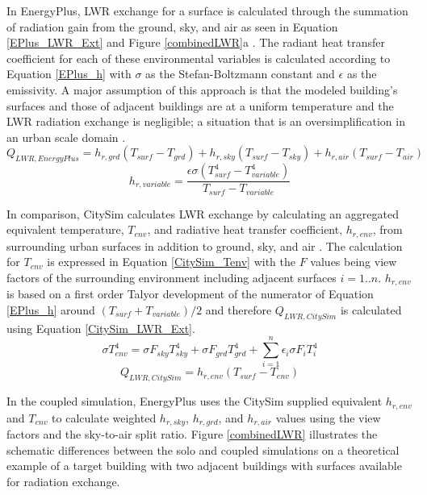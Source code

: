 \documentclass{tBPS2e}
\theoremstyle{plain}
\theoremstyle{definition}
\theoremstyle{remark}
\begin{document}
In EnergyPlus, LWR exchange for a surface is calculated through the summation of radiation gain from the ground, sky, and air as seen in Equation \ref{EPlus_LWR_Ext} and Figure \ref{combinedLWR}a \citep{doe2010energyplus}. The radiant heat transfer coefficient for each of these environmental variables is calculated according to Equation \ref{EPlus_h} with $\sigma$ as the Stefan-Boltzmann constant and $\epsilon$ as the emissivity. A major assumption of this approach is that the modeled building's surfaces and those of adjacent buildings are at a uniform temperature and the LWR radiation exchange is negligible; a situation that is an oversimplification in an urban
scale domain \citep{Evins:2014cf}.
\begin{equation} \label{EPlus_LWR_Ext} 
Q_{LWR,EnergyPlus} = h_{r,grd}(T_{surf}-T_{grd}) + h_{r,sky}(T_{surf}-T_{sky}) + h_{r,air}(T_{surf}-T_{air})
\end{equation}
\begin{equation} \label{EPlus_h} 
h_{r,variable} = \frac{\epsilon\sigma(T^{4}_{surf}-T^{4}_{variable})}{T_{surf}-T_{variable}}
\end{equation}

In comparison, CitySim calculates LWR exchange by calculating an aggregated equivalent temperature, $T_{env}$, and radiative heat transfer coefficient, $h_{r,env}$, from surrounding urban surfaces in addition to ground, sky, and air \citep{Robinson:2009tm}. The calculation for $T_{env}$ is expressed in Equation \ref{CitySim_Tenv} with the $F$ values being view factors of the surrounding environment including adjacent surfaces $i=1..n$. $h_{r,env}$ is based on a first order Talyor development of the numerator of Equation \ref{EPlus_h} around $(T_{surf}+T_{variable})/2$ and therefore $Q_{LWR,CitySim}$ is calculated using Equation \ref{CitySim_LWR_Ext}.
\begin{equation} \label{CitySim_Tenv} 
\sigma T_{env}^4 = \sigma F_{sky}T_{sky}^4 +\sigma F_{grd}T_{grd}^4 + \sum_{i=1}^{n} \epsilon_i \sigma F_{i}T_{i}^4
\end{equation}
\begin{equation} \label{CitySim_LWR_Ext} 
Q_{LWR,CitySim} = h_{r,env}(T_{surf}-T_{env})
\end{equation}

In the coupled simulation, EnergyPlus uses the CitySim supplied equivalent $h_{r,env}$ and $T_{env}$ to calculate weighted $h_{r,sky}$, $h_{r,grd}$, and $h_{r,air}$ values using the view factors and the sky-to-air split ratio. Figure \ref{combinedLWR} illustrates the schematic differences between the solo and coupled simulations on a theoretical example of a target building with two adjacent buildings with surfaces available for radiation exchange.
\end{document}
